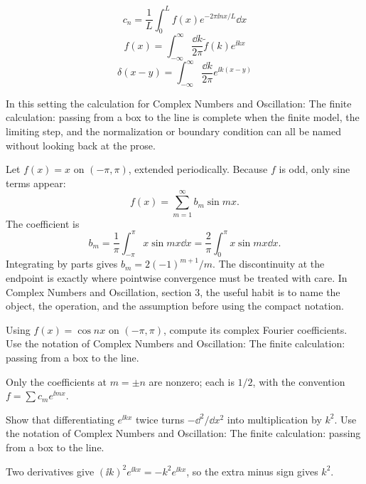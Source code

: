 \[
  c_n=\frac1L\int_0^L f(x)e^{-2\pi\ii nx/L}\dd x
\]
\[
  f(x)=\int_{-\infty}^{\infty}\frac{\dd k}{2\pi}\tilde f(k)e^{\ii kx}
\]
\[
  \delta(x-y)=\int_{-\infty}^{\infty}\frac{\dd k}{2\pi}e^{\ii k(x-y)}
\]

In this setting the calculation for Complex Numbers and Oscillation: The finite calculation: passing from a box to the line is complete when the finite model, the limiting step, and the normalization or boundary condition can all be named without looking back at the prose.




\begin{example}
Let \(f(x)=x\) on \((-\pi,\pi)\), extended periodically.  Because \(f\) is odd, only sine terms appear:
\[
  f(x)=\sum_{m=1}^\infty b_m\sin mx.
\]
The coefficient is
\[
  b_m=\frac1\pi\int_{-\pi}^\pi x\sin mx\dd x
  =\frac2\pi\int_0^\pi x\sin mx\dd x.
\]
Integrating by parts gives \(b_m=2(-1)^{m+1}/m\).  The discontinuity at the endpoint is exactly where pointwise convergence must be treated with care.  In Complex Numbers and Oscillation, section 3, the useful habit is to name the object, the operation, and the assumption before using the compact notation.
\end{example}



\begin{exercise}
Using \(f(x)=\cos nx\) on \((-\pi,\pi)\), compute its complex Fourier coefficients.  Use the notation of Complex Numbers and Oscillation: The finite calculation: passing from a box to the line.
\begin{answer}
Only the coefficients at \(m=\pm n\) are nonzero; each is \(1/2\), with the convention \(f=\sum c_me^{\ii mx}\).
\end{answer}
\end{exercise}

\begin{exercise}
Show that differentiating \(e^{\ii kx}\) twice turns \(-\dd^2/\dd x^2\) into multiplication by \(k^2\).  Use the notation of Complex Numbers and Oscillation: The finite calculation: passing from a box to the line.
\begin{answer}
Two derivatives give \((\ii k)^2e^{\ii kx}=-k^2e^{\ii kx}\), so the extra minus sign gives \(k^2\).
\end{answer}
\end{exercise}



